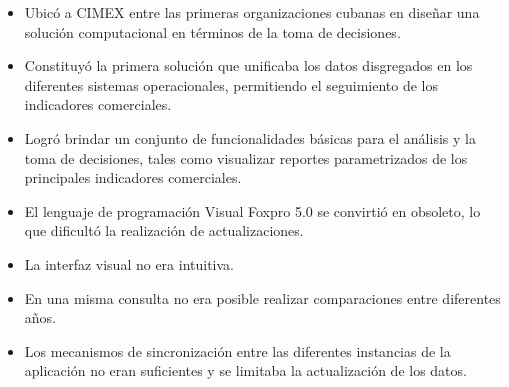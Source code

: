 \begin{itemize}
\item Ubicó a CIMEX entre las primeras organizaciones cubanas en diseñar una solución computacional en términos de la toma de decisiones. 
\item Constituyó la primera solución que unificaba los datos disgregados en los diferentes sistemas operacionales, permitiendo el seguimiento de los indicadores comerciales.
\item Logró brindar un conjunto de funcionalidades básicas para el análisis y la toma de decisiones, tales como visualizar reportes parametrizados de los principales indicadores comerciales.
\item El lenguaje de programación Visual Foxpro 5.0 se convirtió en obsoleto, lo que dificultó la realización de actualizaciones.
\item La interfaz visual no era intuitiva.  
\item En una misma consulta no era posible realizar comparaciones entre diferentes años. 
\item Los mecanismos de sincronización entre las diferentes instancias de la aplicación no eran suficientes y se limitaba la actualización de los datos.
\end{itemize}


